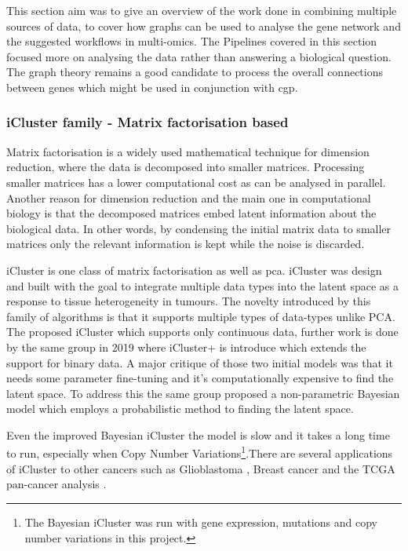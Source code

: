 This section aim was to give an overview of the work done in combining multiple sources of data, to cover how graphs can be used to analyse the gene network and the suggested workflows in multi-omics. The Pipelines covered in this section focused more on analysing the data rather than answering a biological question. The graph theory remains a good candidate to process the overall connections between genes which might be used in conjunction with \acrlong{cgp}.


\subsubsection{iCluster family - Matrix factorisation based} \label{s:lit:iCluster}

Matrix factorisation is a widely used mathematical technique for dimension reduction, where the data is decomposed into smaller matrices. Processing smaller matrices has a lower computational cost as can be analysed in parallel. Another reason for dimension reduction and the main one in computational biology is that the decomposed matrices embed latent information about the biological data. In other words, by condensing the initial matrix data to smaller matrices only the relevant information is kept while the noise is discarded. 

iCluster \cite{Shen2009-ew, Mo2013-zi, Mo2018-el} is one class of matrix factorisation as well as \acrlong{pca}. iCluster was design and built with the goal to integrate multiple data types into the latent space as a response to tissue heterogeneity in tumours. The novelty introduced by this family of algorithms is that it supports multiple types of data-types unlike PCA. The \citet{Shen2009-ew} proposed iCluster which supports only continuous data, further work is done by the same group in 2019 \citet{Mo2013-zi} where iCluster+ is introduce which extends the support for binary data. A major critique of those two initial models was that it needs some parameter fine-tuning and it's computationally expensive to find the latent space. To address this the same group proposed a non-parametric Bayesian model \citet{Mo2018-el} which employs a probabilistic method to finding the latent space. 

Even the improved Bayesian iCluster the model is slow and it takes a long time to run, especially when Copy Number Variations\footnote{The Bayesian iCluster was run with gene expression, mutations and copy number variations in this project.}.There are several applications of iCluster to other cancers such as Glioblastoma \cite{Shen2012-yj},  Breast cancer \citet{Curtis2012-ff} and the TCGA pan-cancer analysis \citet{Hoadley2018-qe}.

